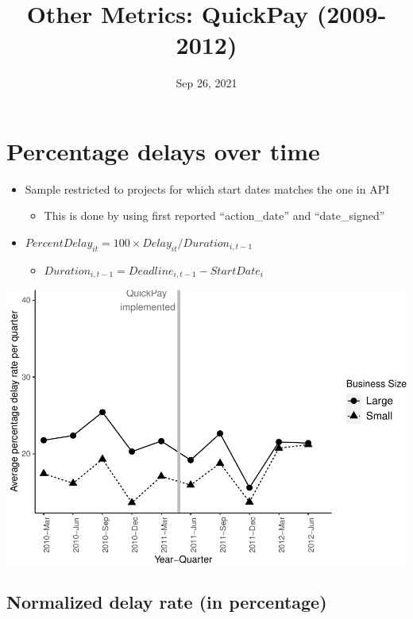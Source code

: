\documentclass[
]{article}
\title{Other Metrics: QuickPay (2009-2012)}
\author{}
\date{\vspace{-2.5em}Sep 26, 2021}
\providecommand{\tightlist}{%
  \setlength{\itemsep}{0pt}\setlength{\parskip}{0pt}}
\begin{document}
\maketitle

\hypertarget{percentage-delays-over-time}{%
\section{Percentage delays over
time}\label{percentage-delays-over-time}}

\begin{itemize}
\tightlist
\item
  Sample restricted to projects for which start dates matches the one in
  API

  \begin{itemize}
  \tightlist
  \item
    This is done by using first reported ``action\_date'' and
    ``date\_signed''
  \end{itemize}
\item
  \(PercentDelay_{it}=100 \times Delay_{it}/Duration_{i,t-1}\)

  \begin{itemize}
  \tightlist
  \item
    \(Duration_{i,t-1} = Deadline_{i,t-1} - StartDate_i\)
  \end{itemize}
\end{itemize}

\includegraphics{qp_first_pc_delay_files/figure-latex/plot_relative_delay-1.pdf}

\hypertarget{normalized-delay-rate-in-percentage}{%
\subsection{Normalized delay rate (in
percentage)}\label{normalized-delay-rate-in-percentage}}
\end{document}
